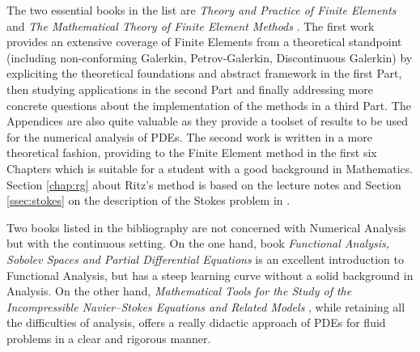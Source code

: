 The two essential books in the list are \textit{Theory and {P}ractice of {F}inite {E}lements} \cite{EG} and \textit{The {M}athematical {T}heory of {F}inite {E}lement {M}ethods} \cite{BS}.
The first work provides an extensive coverage of Finite Elements from a theoretical standpoint (including non-conforming Galerkin, Petrov-Galerkin, Discontinuous Galerkin) by expliciting the theoretical foundations and abstract framework in the first Part, then studying applications in the second Part and finally addressing more concrete questions about the implementation of the methods in a third Part. The Appendices are also quite valuable as they provide a toolset of results to be used for the numerical analysis of PDEs.
The second work is written in a more theoretical fashion, providing  to the Finite Element method in the first six Chapters which is suitable for a student with a good background in Mathematics.
Section \ref{chap:rg} about Ritz's method is based on the lecture notes \cite{RH} and Section \ref{ssec:stokes} on the description of the Stokes problem in \cite{JCL}.

Two books listed in the bibliography are not concerned with Numerical Analysis but with the continuous setting.
On the one hand, book \textit{Functional {A}nalysis, {S}obolev {S}paces and {P}artial {D}ifferential {E}quations} \cite{Brezis} is an excellent introduction to Functional Analysis, but has a steep learning curve without a solid background in Analysis.
On the other hand, \textit{Mathematical {T}ools for the {S}tudy of the {I}ncompressible {N}avier--Stokes {E}quations and {R}elated {M}odels} \cite{BF}, while retaining all the difficulties of analysis, offers a really didactic approach of PDEs for fluid problems in a clear and rigorous manner.
